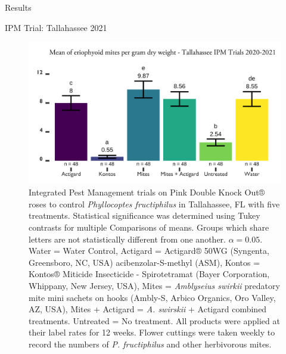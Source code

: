\documentclass[
  ignorenonframetext,
]{beamer}
\begin{document}
\begin{frame}{Results}
\begin{block}{IPM Trial: Tallahassee 2021}
\protect\hypertarget{ipm-trial-tallahassee-2021}{}
\begin{figure}
\includegraphics[width=0.8\linewidth]{figure/rrv_ipm_graph_erios_talla} \caption{Integrated Pest Management trials on Pink Double Knock Out® roses to control \textit{Phyllocoptes fructiphilus} in Tallahassee, FL with five treatments. Statistical significance was determined using Tukey contrasts for multiple Comparisons of means. Groups which share letters are not statistically different from one another. $\alpha = 0.05$. Water = Water Control, Actigard = Actigard® 50WG (Syngenta, Greensboro, NC, USA) acibenzolar-S-methyl (ASM), Kontos = Kontos® Miticide Insecticide - Spirotetramat (Bayer Corporation, Whippany, New Jersey, USA), Mites = \textit{Amblyseius swirkii} predatory mite mini sachets on hooks (Ambly-S, Arbico Organics, Oro Valley, AZ, USA), Mites + Actigard = \textit{A. swirskii} + Actigard combined treatments. Untreated = No treatment. All products were applied at their label rates for 12 weeks. Flower cuttings were taken weekly to record the numbers of \textit{P. fructiphilus} and other herbivorous mites.}\label{fig:ipm-talla-erios}
\end{figure}
\end{block}


\end{frame}
\end{document}
